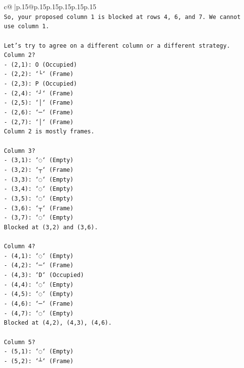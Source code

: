 \documentclass{article}
\begin{document}
{\begin{supertabular}{c@{$\;$}|p{.15\linewidth}@{}p{.15\linewidth}p{.15\linewidth}p{.15\linewidth}p{.15\linewidth}p{.15\linewidth}}
{{{\\ 
\texttt{So, your proposed column 1 is blocked at rows 4, 6, and 7. We cannot use column 1.} \\
\\ 
\texttt{Let's try to agree on a different column or a different strategy. Column 2?} \\
\texttt{{-} (2,1): O (Occupied)} \\
\texttt{{-} (2,2): `└` (Frame)} \\
\texttt{{-} (2,3): P (Occupied)} \\
\texttt{{-} (2,4): `┘` (Frame)} \\
\texttt{{-} (2,5): `│` (Frame)} \\
\texttt{{-} (2,6): `─` (Frame)} \\
\texttt{{-} (2,7): `│` (Frame)} \\
\texttt{Column 2 is mostly frames.} \\
\\ 
\texttt{Column 3?} \\
\texttt{{-} (3,1): `◌` (Empty)} \\
\texttt{{-} (3,2): `┬` (Frame)} \\
\texttt{{-} (3,3): `◌` (Empty)} \\
\texttt{{-} (3,4): `◌` (Empty)} \\
\texttt{{-} (3,5): `◌` (Empty)} \\
\texttt{{-} (3,6): `┬` (Frame)} \\
\texttt{{-} (3,7): `◌` (Empty)} \\
\texttt{Blocked at (3,2) and (3,6).} \\
\\ 
\texttt{Column 4?} \\
\texttt{{-} (4,1): `◌` (Empty)} \\
\texttt{{-} (4,2): `─` (Frame)} \\
\texttt{{-} (4,3): `D` (Occupied)} \\
\texttt{{-} (4,4): `◌` (Empty)} \\
\texttt{{-} (4,5): `◌` (Empty)} \\
\texttt{{-} (4,6): `─` (Frame)} \\
\texttt{{-} (4,7): `◌` (Empty)} \\
\texttt{Blocked at (4,2), (4,3), (4,6).} \\
\\ 
\texttt{Column 5?} \\
\texttt{{-} (5,1): `◌` (Empty)} \\
\texttt{{-} (5,2): `┴` (Frame)} \\
}}}
\end{supertabular}}
\end{document}
